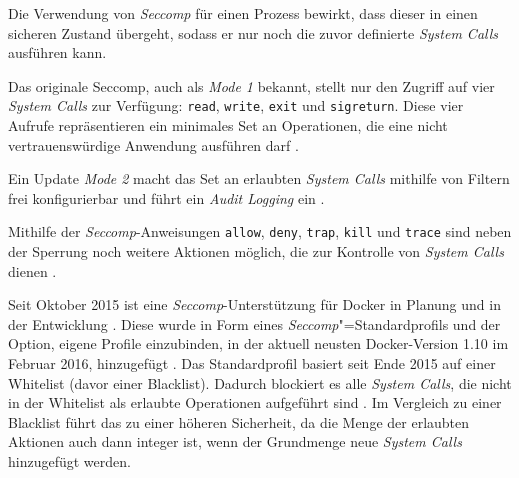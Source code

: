\documentclass[../main.tex]{subfiles}
\begin{document}
			Die Verwendung von \emph{Seccomp} für einen Prozess bewirkt, dass dieser in einen \glqq{}sicheren\grqq{} Zustand übergeht, sodass er nur noch die zuvor definierte \emph{System Calls} ausführen kann.



			Das originale Seccomp, auch als \emph{Mode 1} bekannt, stellt nur den Zugriff auf vier \emph{System Calls} zur Verfügung: \texttt{read}, \texttt{write}, \texttt{exit} und \texttt{sigreturn}. Diese vier Aufrufe repräsentieren ein minimales Set an Operationen, die eine nicht vertrauenswürdige Anwendung ausführen darf \cite{linuxSecOverview}.

			Ein Update \emph{Mode 2} macht das Set an erlaubten \emph{System Calls} mithilfe von Filtern frei konfigurierbar und führt ein \emph{Audit Logging} ein	\cite{linuxSecOverview}\cite{seccompGitDesc}.

			Mithilfe der \emph{Seccomp}-Anweisungen \texttt{allow}, \texttt{deny}, \texttt{trap}, \texttt{kill} und \texttt{trace} sind neben der Sperrung noch weitere Aktionen möglich, die zur Kontrolle von \emph{System Calls} dienen \cite{docker110Security}.

			Seit Oktober 2015 ist eine \emph{Seccomp}-Unterstützung für Docker in Planung und in der Entwicklung \cite{githubGeneralSecProfiles}\cite{githubSeccompIntegration}. Diese wurde in Form eines \emph{Seccomp}"=Standardprofils und der Option, eigene Profile einzubinden, in der aktuell neusten Docker-Version 1.10 im Februar 2016, hinzugefügt \cite{githubDockerChangelog}\cite{githubSeccompProfile}\cite{githubSeccompDoc}\cite{docker110Security}. Das Standardprofil basiert seit Ende 2015 auf einer Whitelist (davor einer Blacklist). Dadurch blockiert es alle \emph{System Calls}, die nicht in der Whitelist als erlaubte Operationen aufgeführt sind \cite{githubSeccompDoc}. Im Vergleich zu einer Blacklist führt das zu einer höheren Sicherheit, da die Menge der erlaubten Aktionen auch dann integer ist, wenn der Grundmenge neue \emph{System Calls}  hinzugefügt werden.
\end{document}
